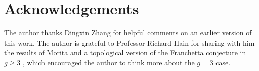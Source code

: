 \documentclass[12pt]{amsart}
\begin{document}
\section*{Acknowledgements}
The author thanks Dingxin Zhang for helpful comments on an earlier version of this work. The author is grateful to Professor Richard Hain for sharing with him the results of Morita and a topological version of the Franchetta conjecture in $g\geq3$ \cite[Theorem 24]{zbMATH01590471}, which encouraged the author to think more about the $g=3$ case.




\end{document}
